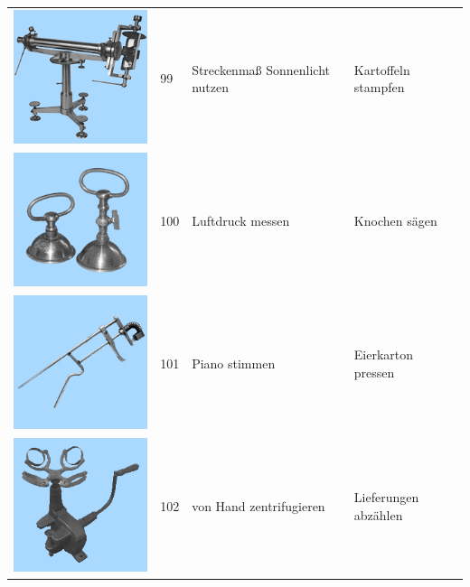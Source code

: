 \documentclass[
  english,
  doc,12pt,twoside,floatsintext]{apa7}
\begin{document}
\begin{center}
\begin{ThreePartTable}
\begin{longtable}{llll}
\includegraphics[valign=c, scale=0.19]{../materials/unfamiliar/99.png} & 99 & Streckenmaß Sonnenlicht nutzen & Kartoffeln stampfen\\
\includegraphics[valign=c, scale=0.19]{../materials/unfamiliar/100.png} & 100 & Luftdruck messen & Knochen sägen\\
\includegraphics[valign=c, scale=0.19]{../materials/unfamiliar/101.png} & 101 & Piano stimmen & Eierkarton pressen\\
\includegraphics[valign=c, scale=0.19]{../materials/unfamiliar/102.png} & 102 & von Hand zentrifugieren & Lieferungen abzählen\\

\end{longtable}
\end{ThreePartTable}
\end{center}
\end{document}
